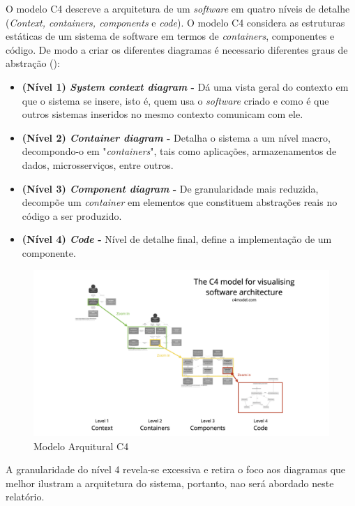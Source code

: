 O modelo C4 descreve a arquitetura de um \textit{software} em quatro níveis de detalhe (\textit{Context, containers, components} e \textit{code}). O modelo C4 considera as estruturas estáticas de um sistema de software em termos de \textit{containers}, componentes e código. De modo a criar os diferentes diagramas é necessario diferentes graus de abstração (\cite{Brown2018}):

\begin{itemize}
    \item \textbf{(Nível 1) \textit{System context diagram} -} Dá uma vista geral do contexto em que o sistema se insere, isto é, quem usa o \textit{software} criado e como é que outros sistemas inseridos no mesmo contexto comunicam com ele. 
    \item \textbf{(Nível 2) \textit{Container diagram} -} Detalha o sistema a um nível macro, decompondo-o em "\textit{containers}", tais como aplicações, armazenamentos de dados, microsserviços, entre outros.
    \item \textbf{(Nível 3) \textit{Component diagram} -} De granularidade mais reduzida, decompõe um     \textit{container} em elementos que constituem abstrações reais no código a ser produzido.
    \item \textbf{(Nível 4) \textit{Code} -} Nível de detalhe final, define a implementação de um componente.
\end{itemize}

\begin{figure}[H]
    \centering
    \includegraphics[width=\linewidth,keepaspectratio]{frontmatter/assets/diagrams/c4-overview.png}
    \caption{Modelo Arquitural C4}
    \label{fig:c4model}
\end{figure}

A granularidade do nível 4 revela-se excessiva e retira o foco aos diagramas que melhor ilustram a arquitetura do sistema, portanto, nao será abordado neste relatório.

